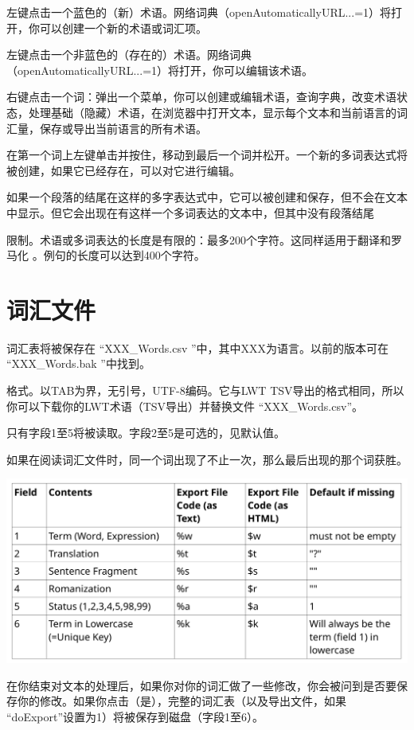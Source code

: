 \documentclass[cn,10pt,math=newtx,citestyle=gb7714-2015,bibstyle=gb7714-2015]{elegantbook}
\begin{document}
左键点击一个蓝色的（新）术语。网络词典（openAutomaticallyURL...=1）将打开，你可以创建一个新的术语或词汇项。

左键点击一个非蓝色的（存在的）术语。网络词典（openAutomaticallyURL...=1）将打开，你可以编辑该术语。

右键点击一个词：弹出一个菜单，你可以创建或编辑术语，查询字典，改变术语状态，处理基础（隐藏）术语，在浏览器中打开文本，显示每个文本和当前语言的词汇量，保存或导出当前语言的所有术语。

在第一个词上左键单击并按住，移动到最后一个词并松开。一个新的多词表达式将被创建，如果它已经存在，可以对它进行编辑。

如果一个段落的结尾在这样的多字表达式中，它可以被创建和保存，但不会在文本中显示。但它会出现在有这样一个多词表达的文本中，但其中没有段落结尾

限制。术语或多词表达的长度是有限的：最多200个字符。这同样适用于翻译和罗马化
。例句的长度可以达到400个字符。


\chapter{词汇文件}\label{词汇文件}
词汇表将被保存在 “XXX\_Words.csv ”中，其中XXX为语言。以前的版本可在
“XXX\_Words.bak ”中找到。

格式。以TAB为界，无引号，UTF-8编码。它与LWT TSV导出的格式相同，所以你可以下载你的LWT术语（TSV导出）并替换文件 “XXX\_Words.csv”。

只有字段1至5将被读取。字段2至5是可选的，见默认值。

如果在阅读词汇文件时，同一个词出现了不止一次，那么最后出现的那个词获胜。

\includegraphics[scale=0.3]{image/table3.png}

在你结束对文本的处理后，如果你对你的词汇做了一些修改，你会被问到是否要保存你的修改。如果你点击（是），完整的词汇表（以及导出文件，如果 “doExport”设置为1）将被保存到磁盘（字段1至6）。
\end{document}
